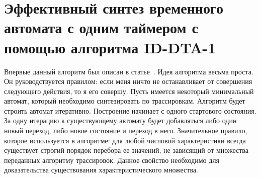 \documentclass[times,specification,annotation]{itmo-student-thesis}
\begin{document}
\section{Эффективный синтез временного автомата с одним таймером с помощью алгоритма ID-DTA-1}

Впервые данный алгоритм был описан в статье~\cite{1-dta}. Идея алгоритма весьма проста.
Он руководствуется правилом: если меня ничто не останавливает от совершения следующего действия, то я его совершу. 
Пусть имеется некоторый минимальный автомат, который необходимо синтезировать по трассировкам. 
Алгоритм будет строить автомат итеративно. Построение начинает с одного стартового состояния. 
За одну итерацию к существующему автомату будет добавляться либо один новый переход, либо новое состояние и переход в него.
Значительное правило, которое используется в алгоритме: для любой числовой характеристики всегда существует строгий порядок перебора ее значений,
не зависящий от множества переданных алгоритму трассировок. Данное свойство необходимо для доказательства существования характеристического множества.
\end{document}
